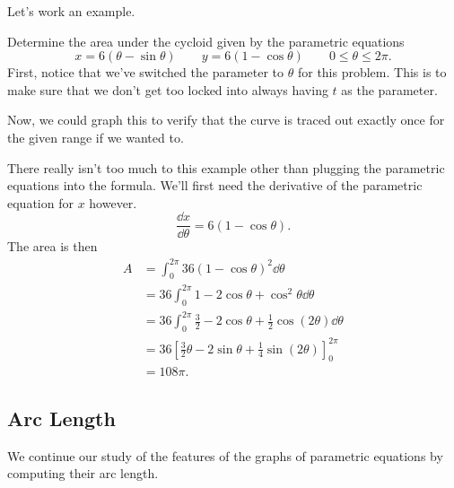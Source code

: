 Let's work an example.

\begin{example}\label{eg_cycloid_area}%
Determine the area under the cycloid given by the parametric equations
\[x=6(\theta-\sin\theta)\qquad y=6(1-\cos\theta)\qquad 0\le\theta\le2\pi.\]
\solution
First, notice that we've switched the parameter to $\theta$ for this problem.  This is to make sure that we don't get too locked into always having $t$ as the parameter.

Now, we could graph this to verify that the curve is traced out exactly once for the given range if we wanted to.
 
There really isn't too much to this example other than plugging the parametric equations into the formula.  We'll first need the derivative of the parametric equation for $x$ however.
\[\frac{\dd x}{\dd\theta}=6(1-\cos\theta).\]
The area is then
\begin{align*}
A
&=\int_0^{2\pi}36(1-\cos\theta)^2\dd\theta\\
&=36\int_0^{2\pi}1-2\cos\theta+\cos^2\theta\dd\theta\\
&=36\int_0^{2\pi}\frac32-2\cos\theta+\frac12\cos(2\theta)\dd\theta\\
&=36\left[\frac32\theta-2\sin\theta+\frac14\sin(2\theta)\right]_0^{2\pi}\\
&=108\pi.
\end{align*}
\end{example}


\subsection{Arc Length}

We continue our study of the features of the graphs of parametric equations by computing their arc length.

